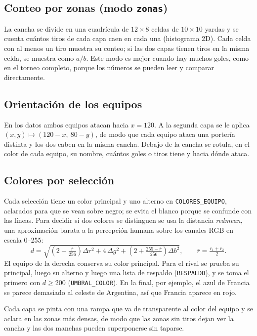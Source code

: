 \documentclass[11pt,a4paper]{article}
\begin{document}
\subsection{Conteo por zonas (modo \texttt{zonas})}

La cancha se divide en una cuadrícula de $12 \times 8$ celdas de $10 \times 10$ yardas y
se cuenta cuántos tiros de cada capa caen en cada una (histograma 2D). Cada celda con al
menos un tiro muestra su conteo; si las dos capas tienen tiros en la misma celda, se
muestra como $a/b$. Este modo es mejor cuando hay muchos goles, como en el torneo
completo, porque los números se pueden leer y comparar directamente.

\subsection{Orientación de los equipos}

En los datos ambos equipos atacan hacia $x = 120$. A la segunda capa se le aplica
$(x, y) \mapsto (120 - x,\ 80 - y)$, de modo que cada equipo ataca una portería distinta
y los dos caben en la misma cancha. Debajo de la cancha se rotula, en el color de cada
equipo, su nombre, cuántos goles o tiros tiene y hacia dónde ataca.

\subsection{Colores por selección}

Cada selección tiene un color principal y uno alterno en \texttt{COLORES\_EQUIPO}, aclarados
para que se vean sobre negro; se evita el blanco porque se confunde con las líneas. Para
decidir si dos colores se distinguen se usa la distancia \emph{redmean}, una aproximación
barata a la percepción humana sobre los canales RGB en escala 0--255:
\begin{equation}
  d = \sqrt{\left(2 + \tfrac{\bar r}{256}\right)\Delta r^2 + 4\,\Delta g^2
            + \left(2 + \tfrac{255 - \bar r}{256}\right)\Delta b^2},
  \qquad \bar r = \tfrac{r_1 + r_2}{2}.
\end{equation}
El equipo de la derecha conserva su color principal. Para el rival se prueba su principal,
luego su alterno y luego una lista de respaldo (\texttt{RESPALDO}), y se toma el primero con
$d \geq 200$ (\texttt{UMBRAL\_COLOR}). En la final, por ejemplo, el azul de Francia se
parece demasiado al celeste de Argentina, así que Francia aparece en rojo.

Cada capa se pinta con una rampa que va de transparente al color del equipo y se aclara en
las zonas más densas, de modo que las zonas sin tiros dejan ver la cancha y las dos
manchas pueden superponerse sin taparse.
\end{document}
